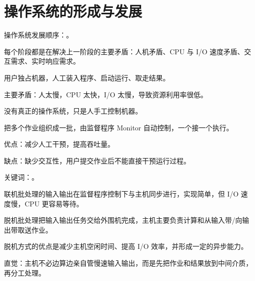 \section{操作系统的形成与发展}
\begin{points}
  \item 操作系统发展顺序：。
  \item 每个阶段都是在解决上一阶段的主要矛盾：人机矛盾、CPU 与 I/O 速度矛盾、交互需求、实时响应需求。
\end{points}


\begin{points}
  \item 用户独占机器，人工装入程序、启动运行、取走结果。
  \item 主要矛盾：人太慢，CPU 太快，I/O 太慢，导致资源利用率很低。
  \item 没有真正的操作系统，只是人手工控制机器。
\end{points}


\begin{points}
  \item 把多个作业组织成一批，由监督程序 Monitor 自动控制，一个接一个执行。
  \item 优点：减少人工干预，提高吞吐量。
  \item 缺点：缺少交互性，用户提交作业后不能直接干预运行过程。
  \item 关键词：。
\end{points}


\begin{points}
  \item 联机批处理的输入输出在监督程序控制下与主机同步进行，实现简单，但 I/O 速度慢，CPU 更容易等待。
  \item 脱机批处理把输入输出任务交给外围机完成，主机主要负责计算和从输入带/向输出带取送作业。
  \item 脱机方式的优点是减少主机空闲时间、提高 I/O 效率，并形成一定的异步能力。
  \item 直觉：主机不必边算边亲自管慢速输入输出，而是先把作业和结果放到中间介质，再分工处理。
\end{points}


